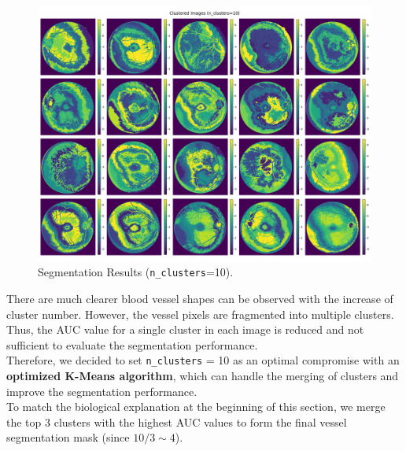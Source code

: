 \documentclass[12pt,letterpaper]{article}
\begin{document}
\vspace{-1cm}
\begin{figure}[H]
    \centering
    \includegraphics[scale=0.3]{Figures/1-2 10 Clusters.png}
    \vspace{-0.25cm}
    \caption{Segmentation Results (\texttt{n\_clusters}=10).}
    \label{fig:n=10}
\end{figure}
\noindent
There are much clearer blood vessel shapes can be observed with the increase of cluster number. However, the vessel pixels are fragmented into multiple clusters. Thus, the AUC value for a single cluster in each image is reduced and not sufficient to evaluate the segmentation performance. \\
Therefore, we decided to set \texttt{n\_clusters} = 10 as an optimal compromise with an \textbf{optimized K-Means algorithm}, which can handle the merging of clusters and improve the segmentation performance. \\
To match the biological explanation at the beginning of this section, we merge the top 3 clusters with the highest AUC values to form the final vessel segmentation mask (since $10/3 \sim 4$).
\end{document}
